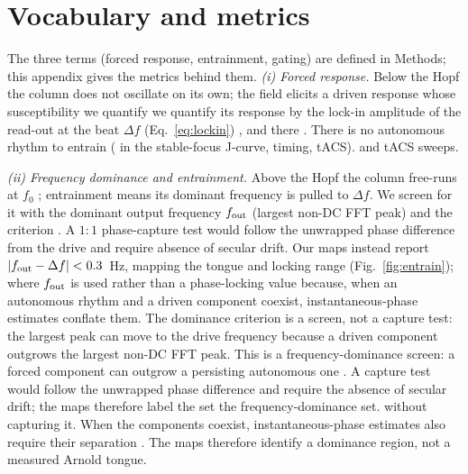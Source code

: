 \documentclass[11pt,a4paper]{article}
\providecommand{\DIFaddtex}[1]{{\protect\color{blue} \sf #1}} %
\providecommand{\DIFdeltex}[1]{{\protect\color{red} \scriptsize #1}} %
\providecommand{\DIFaddbegin}{} %
\providecommand{\DIFaddend}{} %
\providecommand{\DIFdelbegin}{} %
\providecommand{\DIFdelend}{} %
\providecommand{\DIFadd}[1]{\texorpdfstring{\DIFaddtex{#1}}{#1}} %
\providecommand{\DIFdel}[1]{\texorpdfstring{\DIFdeltex{#1}}{}} %
\begin{document}
\section{Vocabulary and metrics}\label{sec:vocab}
\DIFdelbegin \DIFdel{The three terms (forced response, entrainment, gating) are defined in Methods; this
appendix gives the metrics behind them.
}\DIFdelend \emph{\DIFdelbegin \DIFdel{(i) }\DIFdelend Forced response.} Below the Hopf the column does not oscillate on its own;
\DIFdelbegin \DIFdel{the
field elicits a driven response whose susceptibility we quantify }\DIFdelend \DIFaddbegin \DIFadd{we quantify its response }\DIFaddend by the lock-in amplitude \DIFdelbegin \DIFdel{of the read-out }\DIFdelend at the beat $\Delta f$
(Eq.~\eqref{eq:lockin})\DIFdelbegin \DIFdel{, and there }\DIFdelend \DIFaddbegin \DIFadd{. There }\DIFaddend is no autonomous rhythm to entrain \DIFdelbegin \DIFdel{(}\DIFdelend \DIFaddbegin \DIFadd{in the stable-focus
}\DIFaddend J-curve, timing, \DIFdelbegin \DIFdel{tACS).
}\DIFdelend \DIFaddbegin \DIFadd{and tACS sweeps.
}

\DIFaddend \emph{\DIFdelbegin \DIFdel{(ii) }\DIFdelend Frequency \DIFaddbegin \DIFadd{dominance and }\DIFaddend entrainment.} Above the Hopf the column free-runs
at $f_0$\DIFdelbegin \DIFdel{;
entrainment means its dominant frequency is pulled to $\Delta f$. We screen for it with
the dominant output frequency $f_{\rm out}$ (largest non-DC FFT peak) and the criterion
}\DIFdelend \DIFaddbegin \DIFadd{. A $1{:}1$ phase-capture test would follow the unwrapped phase difference
from the drive and require absence of secular drift. Our maps instead report
}\DIFaddend $|f_{\rm out}-\Delta f|<0.3$~Hz, \DIFdelbegin \DIFdel{mapping the tongue and locking range
(Fig.~\ref{fig:entrain}); }\DIFdelend \DIFaddbegin \DIFadd{where }\DIFaddend $f_{\rm out}$ is \DIFdelbegin \DIFdel{used rather than a phase-locking value
\cite{lachaux1999} because, when an autonomous rhythm and a driven component coexist,
instantaneous-phase estimates conflate them. The dominance criterion is a screen, not a
capture test: the largest peak can move to the drive frequency because a driven component outgrows }\DIFdelend \DIFaddbegin \DIFadd{the largest non-DC FFT
peak. This is a frequency-dominance screen: }\DIFaddend a \DIFaddbegin \DIFadd{forced component can outgrow a
}\DIFaddend persisting autonomous one \DIFdelbegin \DIFdel{. A capture test would follow the unwrapped phase
difference and require the absence of secular drift; the maps therefore label the set the
frequency-dominance set.
}\DIFdelend \DIFaddbegin \DIFadd{without capturing it. When the components coexist,
instantaneous-phase estimates also require their separation
\cite{lachaux1999}. The maps therefore identify a dominance region, not a
measured Arnold tongue.
}
\end{document}
